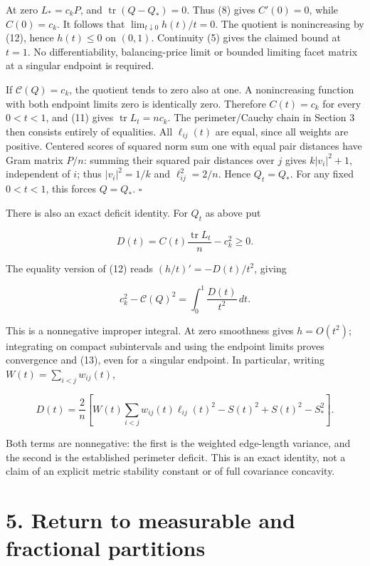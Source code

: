 \documentclass[11pt]{article}
\begin{document}
At zero \(L_*=c_kP\), and \(\operatorname{tr}(Q-Q_*)=0\). Thus (8) gives
\(C'(0)=0\), while \(C(0)=c_k\). It follows that
\(\lim_{t\downarrow0}h(t)/t=0\). The quotient is nonincreasing by (12),
hence \(h(t)\le0\) on \((0,1)\). Continuity (5) gives the claimed bound
at \(t=1\). No differentiability, balancing-price limit or bounded
limiting facet matrix at a singular endpoint is required.

If \(\mathcal C(Q)=c_k\), the quotient tends to zero also at one. A
nonincreasing function with both endpoint limits zero is identically
zero. Therefore \(C(t)=c_k\) for every \(0<t<1\), and (11) gives
\(\operatorname{tr}L_t=nc_k\). The perimeter/Cauchy chain in Section 3
then consists entirely of equalities. All \(\ell_{ij}(t)\) are equal,
since all weights are positive. Centered scores of squared norm sum one
with equal pair distances have Gram matrix \(P/n\): summing their
squared pair distances over \(j\) gives \(k|v_i|^2+1\), independent of
\(i\); thus \(|v_i|^2=1/k\) and \(\ell_{ij}^2=2/n\). Hence \(Q_t=Q_*\).
For any fixed \(0<t<1\), this forces \(Q=Q_*\). \(\square\)

There is also an exact deficit identity. For \(Q_t\) as above put

\[
 D(t)=C(t)\frac{\operatorname{tr}L_t}{n}-c_k^2\ge0.
\]

The equality version of (12) reads \((h/t)'=-D(t)/t^2\), giving

\[
 c_k^2-\mathcal C(Q)^2=\int_0^1\frac{D(t)}{t^2}\,dt.     \tag{13}
\]

This is a nonnegative improper integral. At zero smoothness gives
\(h=O(t^2)\); integrating on compact subintervals and using the endpoint
limits proves convergence and (13), even for a singular endpoint. In
particular, writing \(W(t)=\sum_{i<j}w_{ij}(t)\),

\[
 D(t)=\frac2n\left[
   W(t)\sum_{i<j}w_{ij}(t)\ell_{ij}(t)^2-S(t)^2
                         +S(t)^2-S_*^2\right].           \tag{14}
\]

Both terms are nonnegative: the first is the weighted edge-length
variance, and the second is the established perimeter deficit. This is
an exact identity, not a claim of an explicit metric stability constant
or of full covariance concavity.

\section{5. Return to measurable and fractional
partitions}\label{return-to-measurable-and-fractional-partitions}
\end{document}
